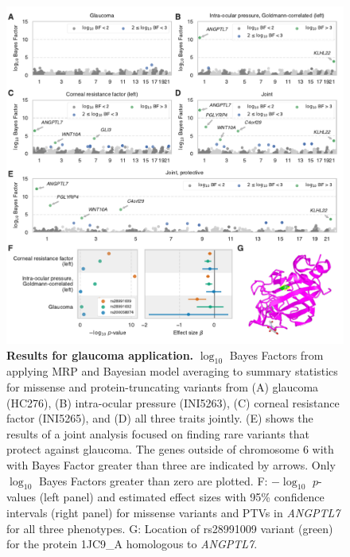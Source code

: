
\begin{figure}[!h]
\includegraphics[width=\textwidth]{../figures/final/Figure_04.pdf}
\caption{{\bf Results for glaucoma application.}
$\log_{10}$ Bayes Factors from applying MRP and Bayesian model averaging to summary statistics for missense and protein-truncating variants from (A) glaucoma (HC276), (B) intra-ocular pressure (INI5263), (C) corneal resistance factor (INI5265), and (D) all three traits jointly. (E) shows the results of a joint analysis focused on finding rare variants that protect against glaucoma. The genes outside of chromosome 6 with with Bayes Factor greater than three are indicated by arrows. Only $\log_{10}$ Bayes Factors greater than zero are plotted. F: $-\log_{10}$ $p$-values (left panel) and estimated effect sizes with 95\% confidence intervals (right panel) for missense variants and PTVs in \textit{ANGPTL7} for all three phenotypes. G: Location of rs28991009 variant (green) for the protein 1JC9\_A homologous to \textit{ANGPTL7}.}
\label{glaucoma_bma}
\end{figure}

